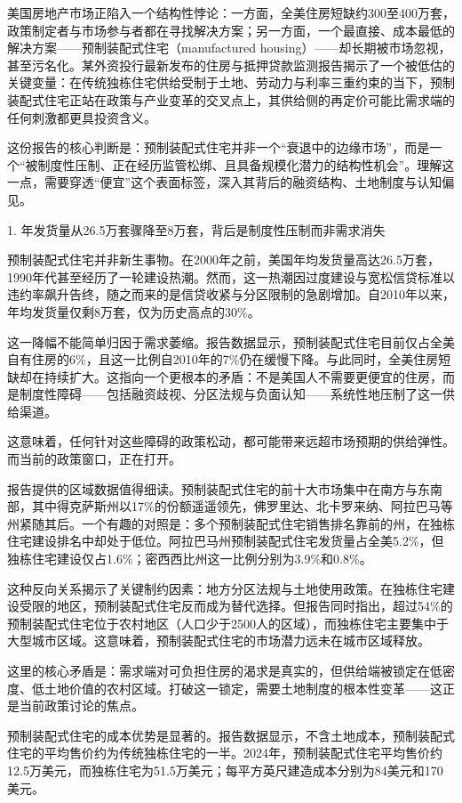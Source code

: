 \documentclass[11pt]{ctexart}
\begin{document}
美国房地产市场正陷入一个结构性悖论：一方面，全美住房短缺约300至400万套，政策制定者与市场参与者都在寻找解决方案；另一方面，一个最直接、成本最低的解决方案——预制装配式住宅（manufactured housing）——却长期被市场忽视，甚至污名化。某外资投行最新发布的住房与抵押贷款监测报告揭示了一个被低估的关键变量：在传统独栋住宅供给受制于土地、劳动力与利率三重约束的当下，预制装配式住宅正站在政策与产业变革的交叉点上，其供给侧的再定价可能比需求端的任何刺激都更具投资含义。

这份报告的核心判断是：预制装配式住宅并非一个“衰退中的边缘市场”，而是一个“被制度性压制、正在经历监管松绑、且具备规模化潜力的结构性机会”。理解这一点，需要穿透“便宜”这个表面标签，深入其背后的融资结构、土地制度与认知偏见。

1. 年发货量从26.5万套骤降至8万套，背后是制度性压制而非需求消失

预制装配式住宅并非新生事物。在2000年之前，美国年均发货量高达26.5万套，1990年代甚至经历了一轮建设热潮。然而，这一热潮因过度建设与宽松信贷标准以违约率飙升告终，随之而来的是信贷收紧与分区限制的急剧增加。自2010年以来，年均发货量仅剩8万套，仅为历史高点的30\%。

这一降幅不能简单归因于需求萎缩。报告数据显示，预制装配式住宅目前仅占全美自有住房的6\%，且这一比例自2010年的7\%仍在缓慢下降。与此同时，全美住房短缺却在持续扩大。这指向一个更根本的矛盾：不是美国人不需要更便宜的住房，而是制度性障碍——包括融资歧视、分区法规与负面认知——系统性地压制了这一供给渠道。

这意味着，任何针对这些障碍的政策松动，都可能带来远超市场预期的供给弹性。而当前的政策窗口，正在打开。

报告提供的区域数据值得细读。预制装配式住宅的前十大市场集中在南方与东南部，其中得克萨斯州以17\%的份额遥遥领先，佛罗里达、北卡罗来纳、阿拉巴马等州紧随其后。一个有趣的对照是：多个预制装配式住宅销售排名靠前的州，在独栋住宅建设排名中却处于低位。阿拉巴马州预制装配式住宅发货量占全美5.2\%，但独栋住宅建设仅占1.6\%；密西西比州这一比例分别为3.9\%和0.8\%。

这种反向关系揭示了关键制约因素：地方分区法规与土地使用政策。在独栋住宅建设受限的地区，预制装配式住宅反而成为替代选择。但报告同时指出，超过54\%的预制装配式住宅位于农村地区（人口少于2500人的区域），而独栋住宅主要集中于大型城市区域。这意味着，预制装配式住宅的市场潜力远未在城市区域释放。

这里的核心矛盾是：需求端对可负担住房的渴求是真实的，但供给端被锁定在低密度、低土地价值的农村区域。打破这一锁定，需要土地制度的根本性变革——这正是当前政策讨论的焦点。

预制装配式住宅的成本优势是显著的。报告数据显示，不含土地成本，预制装配式住宅的平均售价约为传统独栋住宅的一半。2024年，预制装配式住宅平均售价约12.5万美元，而独栋住宅为51.5万美元；每平方英尺建造成本分别为84美元和170美元。
\end{document}
